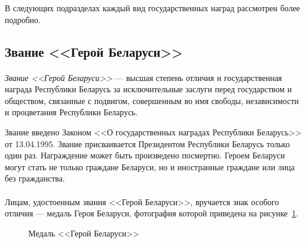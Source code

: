 В следующих подразделах каждый вид государственных наград
рассмотрен более подробно. 

\pagebreak
\subsection{Звание <<Герой Беларуси>>}

\paragraph{}
\textit{Звание <<Герой Беларуси>>} --- высшая степень отличия и 
государственная награда Республики Беларусь за исключительные заслуги
перед государством и обществом, связанные с подвигом,
совершенным во имя свободы, независимости и процветания Республики Беларусь.

Звание введено Законом <<О государственных наградах Республики Беларусь>>
от 13.04.1995. Звание присваивается Президентом Республики Беларусь
только один раз. Награждение может быть произведено посмертно.
Героем Беларуси могут стать не только граждане Беларуси,
но и иностранные граждане или лица без гражданства.

\paragraph{}
Лицам, удостоенным звания <<Герой Беларуси>>, 
вручается знак особого отличия --- медаль Героя Беларуси,
фотография которой приведена на рисунке~\ref{fig:medal_hero_belarus}.

\begin{figure}[h]
  \centering
  {
    \setlength{\fboxsep}{0pt}%
    \setlength{\fboxrule}{1pt}%
  }
  \caption{Медаль <<Герой Беларуси>>}
  \label{fig:medal_hero_belarus}
\end{figure}

